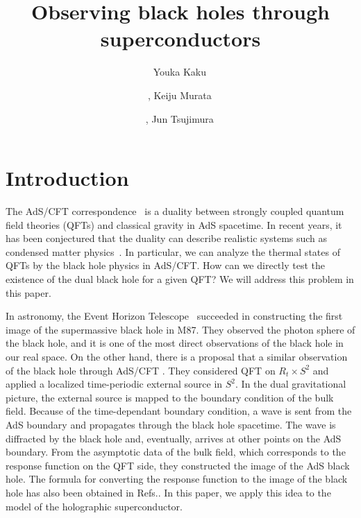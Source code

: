\documentclass[a4paper,11pt]{article}
\title{
    Observing black holes through superconductors
}
\author[a]{Youka Kaku\,}
\author[b]{\!, Keiju Murata\,}
\author[c]{\!, Jun Tsujimura\,}
\affiliation[a,c]{Department of Physics, Nagoya University, Chikusa, Nagoya 464-8602, Japan}
\affiliation[b]{Department of Physics, College of Humanities and Sciences, Nihon University, Sakurajosui, Tokyo 156-8550, Japan}
\begin{document}
\maketitle
\flushbottom
\notoc


\section{Introduction}
\label{sec:Introduction}

    The AdS/CFT correspondence~\cite{Maldacena:1997re,Gubser:1998bc,Witten:1998qj} is a duality between strongly coupled quantum field theories (QFTs) and classical gravity in AdS spacetime. 
    In recent years, it has been conjectured that the duality can  describe  realistic systems such as condensed matter physics~\cite{Hartnoll:2009sz,Herzog:2009xv,McGreevy:2009xe,Horowitz:2010gk,Sachdev:2010ch}. 
    In particular, we can analyze the thermal states of QFTs  by the black hole physics in AdS/CFT. 
    How can we directly test the existence of the dual black hole for a given QFT? We will address this problem in this paper.

    In astronomy, the Event Horizon Telescope~\cite{Akiyama:2019cqa} succeeded in constructing the first image of the supermassive black hole in M87. 
    They observed the photon sphere of the black hole, and it is one of the most direct observations of the black hole in our real space. 
    On the other hand, there is a proposal that a similar observation of the black hole through AdS/CFT \cite{Hashimoto:2018okj,Hashimoto:2019jmw}.
    They considered QFT on $R_t\times S^2$ and applied a localized time-periodic external source in $S^2$. 
    In the dual gravitational picture, the external source is mapped to the boundary condition of the bulk field. 
    Because of the time-dependant boundary condition, a  wave is sent from the AdS boundary and propagates through the black hole spacetime. 
    The wave is diffracted by the black hole and, eventually, arrives at other points on the AdS boundary. 
    From the asymptotic data of the bulk field, which corresponds to the response function on the QFT side, %
    they constructed the image of the AdS black hole.
    The formula for converting the response function to the image of the black hole has also been obtained in Refs.\cite{Hashimoto:2018okj,Hashimoto:2019jmw}.
    In this paper, we apply this idea  to the model of the holographic superconductor.
\end{document}
